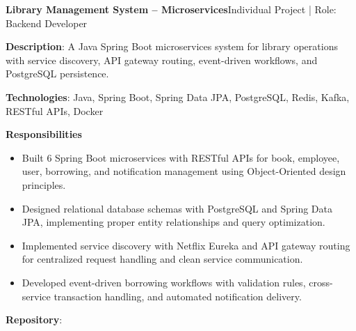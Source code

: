   \resumeProjectHeading
    {\textbf{Library Management System -- Microservices}}{Individual Project | Role: Backend Developer}
    \resumeItemListStart
      \item \textbf{Description}: A Java Spring Boot microservices system for library operations with service discovery,
        API gateway routing, event-driven workflows, and PostgreSQL persistence.
      \item \textbf{Technologies}: Java, Spring Boot, Spring Data JPA, PostgreSQL, Redis, Kafka, RESTful APIs, Docker
      \item \textbf{Responsibilities}
        \begin{itemize}
          \item Built 6 Spring Boot microservices with RESTful APIs for book, employee, user, borrowing, and notification management using Object-Oriented design principles.
          \item Designed relational database schemas with PostgreSQL and Spring Data JPA, implementing proper entity relationships and query optimization.
          \item Implemented service discovery with Netflix Eureka and API gateway routing for centralized request handling and clean service communication.
          \item Developed event-driven borrowing workflows with validation rules, cross-service transaction handling, and automated notification delivery.
        \end{itemize}
      \item \textbf{Repository}: \href{https://github.com/nvminh162/backend-library-system}{}
    \resumeItemListEnd

\resumeSubHeadingListEnd
